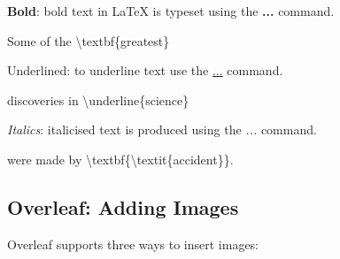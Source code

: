 \documentclass[
  letterpaper,
  DIV=11,
  numbers=noendperiod]{scrartcl}
\newenvironment{Shaded}{\begin{snugshade}}{\end{snugshade}}
\newcommand{\FunctionTok}[1]{\textcolor[rgb]{0.28,0.35,0.67}{#1}}
\newcommand{\NormalTok}[1]{\textcolor[rgb]{0.00,0.23,0.31}{#1}}
\begin{document}
\textbf{Bold}: bold text in LaTeX is typeset using the \textbf{...}
command.

\begin{codelisting}

\caption{\texttt{Example of Bolding}}

\begin{Shaded}
\begin{Highlighting}[]
\NormalTok{Some of the }\FunctionTok{\textbackslash{}textbf}\NormalTok{\{greatest\}}
\end{Highlighting}
\end{Shaded}

\end{codelisting}

Underlined: to underline text use the \underline{...} command.

\begin{codelisting}

\caption{\texttt{Example of Underlining}}

\begin{Shaded}
\begin{Highlighting}[]
\NormalTok{discoveries in }\FunctionTok{\textbackslash{}underline}\NormalTok{\{science\} }
\end{Highlighting}
\end{Shaded}

\end{codelisting}

\emph{Italics}: italicised text is produced using the \textit{...}
command.

\begin{codelisting}

\caption{\texttt{Example of Italicizing}}

\begin{Shaded}
\begin{Highlighting}[]
\NormalTok{were made by }\FunctionTok{\textbackslash{}textbf}\NormalTok{\{}\FunctionTok{\textbackslash{}textit}\NormalTok{\{accident\}\}.}
\end{Highlighting}
\end{Shaded}

\end{codelisting}

\subsection{Overleaf: Adding Images}\label{overleaf-adding-images}

Overleaf supports three ways to insert images:
\end{document}
